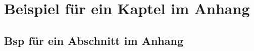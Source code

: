 \appendix

\chapter{Beispiel für ein Kaptel im Anhang}\label{appkap:bsp1}

\section{Bsp für ein Abschnitt im Anhang}\label{appsec:bsp2}